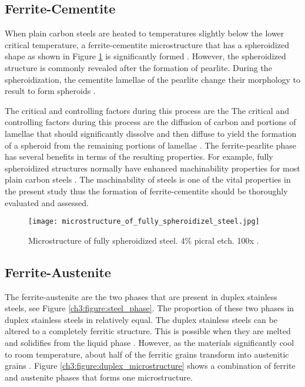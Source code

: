 \subsection{Ferrite-Cementite}
When plain carbon steels are heated to temperatures slightly below the lower critical temperature, a ferrite-cementite microstructure that has a spheroidized shape as shown in Figure \ref{ch3:figure:spheroidized_steel} is significantly formed \cite{molabe2018determining}. However, the spheroidized structure is commonly revealed after the formation of pearlite. During the spheroidization, the cementite lamellae of the pearlite change their morphology to result to form spheroids \cite{molabe2018determining}.

The critical and controlling factors during this process are the The critical and controlling factors during this process are the diffusion of carbon and portions of lamellae that should significantly dissolve and then diffuse to yield the formation of a spheroid from the remaining portions of lamellae \cite{molabe2018determining}. The ferrite-pearlite phase has several benefits in terms of the resulting properties. For example, fully spheroidized structures normally have enhanced machinability properties for most plain carbon steels \cite{molabe2018determining}.  The machinability of steels is one of the vital properties in the present study thus the formation of ferrite-cementite should be thoroughly evaluated and assessed.

\begin{figure}[H]
    \centering
    \texttt{[image: microstructure\_of\_fully\_spheroidizel\_steel.jpg]}
    \caption{Microstructure of fully spheroidized steel. 4\% picral etch. 100x \cite{molabe2018determining}.}
    \label{ch3:figure:spheroidized_steel}
\end{figure}

\subsection{Ferrite-Austenite}
The ferrite-austenite are the two phases that are present in duplex stainless steels, see Figure \ref{ch3:figure:steel_phase}. The proportion of these two phases in duplex stainless steels in relatively equal. The duplex stainless steels can be altered to a completely ferritic structure. This is possible when they are melted and solidifies from the liquid phase \cite{xiao2006challenge}.  However, as the materials significantly cool to room temperature, about half of the ferritic grains transform into austenitic grains \cite{steels3practical}. Figure \ref{ch3:figure:duplex_microstructure} shows a combination of ferrite and austenite phases that forms one microstructure.

